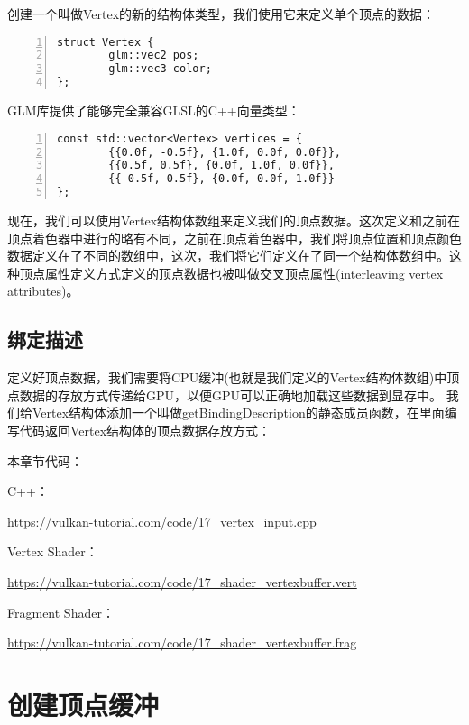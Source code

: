 \documentclass{ctexart}
\begin{document}
创建一个叫做Vertex的新的结构体类型，我们使用它来定义单个顶点的数据：

\begin{lstlisting}[language={[ANSI]C},keywordstyle=\color{blue!70},commentstyle=\color{red!50!green!50!blue!50},frame=shadowbox, rulesepcolor=\color{red!20!green!20!blue!20},basicstyle=\small,numbers=left, numberstyle=\tiny,breaklines=true]
struct Vertex {
		glm::vec2 pos;
		glm::vec3 color;
};
\end{lstlisting}

GLM库提供了能够完全兼容GLSL的C++向量类型：

\begin{lstlisting}[language={[ANSI]C},keywordstyle=\color{blue!70},commentstyle=\color{red!50!green!50!blue!50},frame=shadowbox, rulesepcolor=\color{red!20!green!20!blue!20},basicstyle=\small,numbers=left, numberstyle=\tiny,breaklines=true]
const std::vector<Vertex> vertices = {
		{{0.0f, -0.5f}, {1.0f, 0.0f, 0.0f}},
		{{0.5f, 0.5f}, {0.0f, 1.0f, 0.0f}},
		{{-0.5f, 0.5f}, {0.0f, 0.0f, 1.0f}}
};
\end{lstlisting}

现在，我们可以使用Vertex结构体数组来定义我们的顶点数据。这次定义和之前在顶点着色器中进行的略有不同，之前在顶点着色器中，我们将顶点位置和顶点颜色数据定义在了不同的数组中，这次，我们将它们定义在了同一个结构体数组中。这种顶点属性定义方式定义的顶点数据也被叫做交叉顶点属性(interleaving vertex attributes)。

\subsection{绑定描述}

定义好顶点数据，我们需要将CPU缓冲(也就是我们定义的Vertex结构体数组)中顶点数据的存放方式传递给GPU，以便GPU可以正确地加载这些数据到显存中。
我们给Vertex结构体添加一个叫做getBindingDescription的静态成员函数，在里面编写代码返回Vertex结构体的顶点数据存放方式：

本章节代码：

C++：

\url{https://vulkan-tutorial.com/code/17_vertex_input.cpp}

Vertex Shader：

\url{https://vulkan-tutorial.com/code/17_shader_vertexbuffer.vert}

Fragment Shader：

\url{https://vulkan-tutorial.com/code/17_shader_vertexbuffer.frag}

\newpage
\section{创建顶点缓冲}
\end{document}
